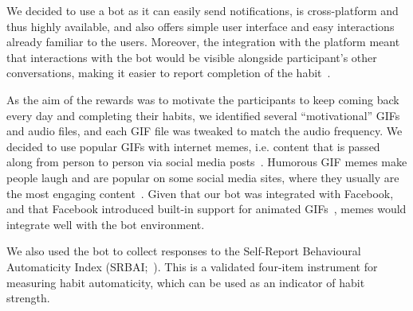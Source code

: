 \documentclass{scaffold/sigchi}
\begin{document}
We decided to use a bot as it can easily send notifications, is cross-platform and thus highly available, and also offers simple user interface and easy interactions already familiar to the users. Moreover, the integration with the platform meant that interactions with the bot would be visible alongside participant's other conversations, making it easier to report completion of the habit~\cite{the_power_of_logging_mobile_notifications}.

As the aim of the rewards was to motivate the participants to keep coming back every day and completing their habits, we identified several ``motivational'' GIFs and audio files, and each GIF file was tweaked to match the audio frequency. We decided to use popular GIFs with internet memes, i.e. content that is passed along from person to person via social media posts~\cite{meme_definition}. Humorous GIF memes make people laugh and are popular on some social media sites, where they usually are the most engaging content~\cite{meme_gifs_are_good}. Given that our bot was integrated with Facebook, and that Facebook introduced built-in support for animated GIFs~\cite{fb_gif_rollout}, memes would integrate well with the bot environment. 

We also used the bot to collect responses to the Self-Report Behavioural Automaticity Index (SRBAI;~\cite{article_4q_SRBAI}). This is a validated four-item instrument for measuring habit automaticity, which can be used as an indicator of habit strength. %
\end{document}

